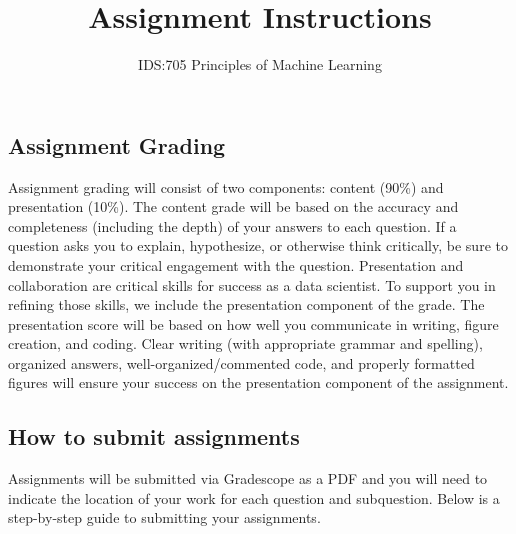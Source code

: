 \documentclass[
  letterpaper,
  DIV=11,
  numbers=noendperiod]{scrartcl}
\title{Assignment Instructions}
\subtitle{IDS:705 Principles of Machine Learning}
\author{}
\date{}
\renewcommand*\contentsname{Table of contents}
\newcommand\contentsname{Table of contents}
\begin{document}
\maketitle

\renewcommand*\contentsname{Table of contents}
{
\hypersetup{linkcolor=}
\setcounter{tocdepth}{1}
\tableofcontents
}

\subsection{Assignment Grading}\label{assignment-grading}

Assignment grading will consist of two components: content (90\%) and
presentation (10\%). The content grade will be based on the accuracy and
completeness (including the depth) of your answers to each question. If
a question asks you to explain, hypothesize, or otherwise think
critically, be sure to demonstrate your critical engagement with the
question. Presentation and collaboration are critical skills for success
as a data scientist. To support you in refining those skills, we include
the presentation component of the grade. The presentation score will be
based on how well you communicate in writing, figure creation, and
coding. Clear writing (with appropriate grammar and spelling), organized
answers, well-organized/commented code, and properly formatted figures
will ensure your success on the presentation component of the
assignment.

\subsection{How to submit assignments}\label{how-to-submit-assignments}

Assignments will be submitted via Gradescope as a PDF and you will need
to indicate the location of your work for each question and subquestion.
Below is a step-by-step guide to submitting your assignments.
\end{document}
